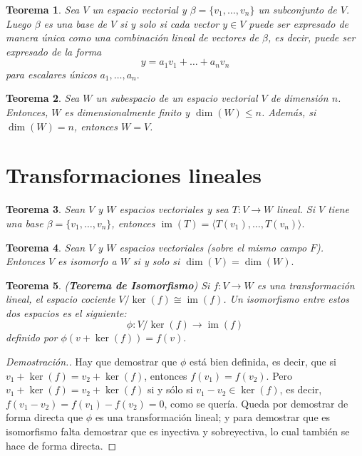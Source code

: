 \documentclass[12pt]{book}
\newtheorem{theorem}{Teorema}[section]
\theoremstyle{definition}
\DeclareMathOperator{\im}{im}
\newcounter{in}
\newcounter{ini}
\begin{document}
\begin{theorem}
  \label{clunica}
  Sea $V$ un espacio vectorial y $\beta=\{v_{1},\dots,v_{n}\}$ un
  subconjunto de $V$. Luego $\beta$ es una base de $V$ si y solo si
  cada vector $y\in V$ puede ser expresado de manera única como una
  combinación lineal de vectores de $\beta$, es decir, puede ser
  expresado de la forma
  $$y=a_{1}v_{1}+\ldots+a_{n}v_{n}$$
  para escalares únicos $a_{1},\ldots,a_{n}.$
\end{theorem}

\begin{theorem}
  \label{esp-iguales}
  Sea $W$ un subespacio de un espacio vectorial $V$ de dimensión
  $n$. Entonces, $W$ es dimensionalmente finito y $\dim(W)\leq
  n$. Además, si $\dim(W)=n$, entonces $W=V$.
\end{theorem}

\section{Transformaciones lineales}

\begin{theorem}
  \label{imT}
  Sean $V$ y $W$ espacios vectoriales y sea $T:V \rightarrow W$
  lineal. Si $V$ tiene una base $\beta=\{v_{1},\ldots,v_{n}\}$,
  entonces $\im(T)=\langle T(v_{1}),\ldots,T(v_{n})\rangle.$  
\end{theorem}

\begin{theorem}
  \label{esp-isomorfos}
  Sean $V$ y $W$ espacios vectoriales (sobre el mismo campo
  $F$). Entonces $V$ es isomorfo a $W$ si y solo si $\dim (V)=\dim(W).$ 
\end{theorem}

\begin{theorem}{(\textbf{Teorema de Isomorfismo})}
  Si $f:V\rightarrow W$ es una transformación lineal, el espacio
  cociente $V/\ker(f)\cong \im(f)$. Un isomorfismo entre estos dos
  espacios es el siguiente:
  $$\phi:V/\ker(f)\rightarrow \im(f)$$
  definido por $\phi(v+\ker(f))=f(v).$
\end{theorem}
\begin{proof}[Demostración.]
  Hay que demostrar que $\phi$ está bien definida, es decir, que si
  $v_1+\ker(f)=v_2+\ker(f)$, entonces
  $f(v_1)=f(v_{2}).$ Pero
  $v_1+\ker(f)=v_2+\ker(f)$ si y sólo si
  $v_{1}-v_{2}\in \ker(f)$, es decir,
  $f(v_{1}-v_{2})=f(v_1)-f(v_2)=0$,
  como se quería. Queda por demostrar de forma directa que $\phi$ es
  una transformación lineal; y para demostrar que es isomorfismo falta
  demostrar que es inyectiva y sobreyectiva, lo cual también se hace
  de forma directa.
\end{proof}
\end{document}
